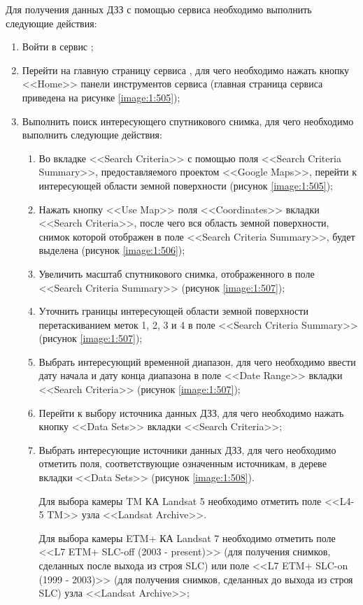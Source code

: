 Для получения данных ДЗЗ с помощью сервиса \ee необходимо выполнить следующие действия:

\begin{enumerate}

	\item Войти в сервис \ee;
	\item Перейти на главную страницу сервиса \ee, для чего необходимо нажать кнопку <<Home>> панели инструментов сервиса (главная страница сервиса приведена на рисунке \ref{image:1:505});
	\item Выполнить поиск интересующего спутникового снимка, для чего необходимо выполнить следующие действия:

		\begin{enumerate}

			\item Во вкладке <<Search Criteria>> с помощью поля <<Search Criteria Summary>>, предоставляемого проектом <<Google Maps>>, перейти к интересующей области земной поверхности (рисунок \ref{image:1:505});
			\item Нажать кнопку <<Use Map>> поля <<Coordinates>> вкладки <<Search Criteria>>, после чего вся область земной поверхности, снимок которой отображен в поле <<Search Criteria Summary>>, будет выделена (рисунок \ref{image:1:506});
			\item Увеличить масштаб спутникового снимка, отображенного в поле <<Search Criteria Summary>> (рисунок \ref{image:1:507});
			\item Уточнить границы интересующей области земной поверхности перетаскиванием меток 1, 2, 3 и 4 в поле <<Search Criteria Summary>> (рисунок \ref{image:1:507});
			\item Выбрать интересующий временной диапазон, для чего необходимо ввести дату начала и дату конца диапазона в поле <<Date Range>> вкладки <<Search Criteria>> (рисунок \ref{image:1:507});
			\item Перейти к выбору источника данных ДЗЗ, для чего необходимо нажать кнопку <<Data Sets>> вкладки <<Search Criteria>>;
			\item Выбрать интересующие источники данных ДЗЗ, для чего необходимо отметить поля, соответствующие означенным источникам, в дереве вкладки <<Data Sets>> (рисунок \ref{image:1:508}).

			Для выбора камеры TM КА Landsat 5 необходимо отметить поле <<L4-5 TM>> узла <<Landsat Archive>>.

			Для выбора камеры ETM+ КА Landsat 7 необходимо отметить поле <<L7 ETM+ SLC-off (2003 - present)>> (для получения снимков, сделанных после выхода из строя SLC) или поле <<L7 ETM+ SLC-on (1999 - 2003)>> (для получения снимков, сделанных до выхода из строя SLC) узла <<Landsat Archive>>;


\end{enumerate}
\end{enumerate}
